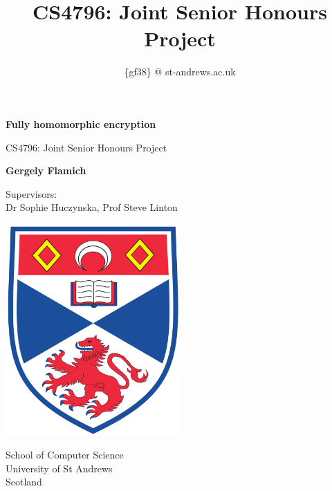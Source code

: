 \documentclass{article}
\title{CS4796: Joint Senior Honours Project}
\author{\{gf38\} @ st-andrews.ac.uk}
\theoremstyle{definition}
\begin{document}
\begin{titlepage}
    \begin{center}
        \vspace*{1cm}
        
        \textbf{Fully homomorphic encryption}
        
        \vspace{0.5cm}
        
        CS4796: Joint Senior Honours Project \\
                
        
        \vspace{1cm}
        
        \textbf{Gergely Flamich}

        \vspace{0.5cm}
        Supervisors:\\
        Dr Sophie Huczynska, Prof Steve Linton
        
        \vfill
        
        \includegraphics[width=0.5\textwidth]{img/uni_crest}
        
        \vspace{0.8cm}
        
        School of Computer Science\\
        University of St Andrews\\
        Scotland\\
        
    \end{center}
\end{titlepage}

\begin{abstract}
\end{abstract}
\end{document}
